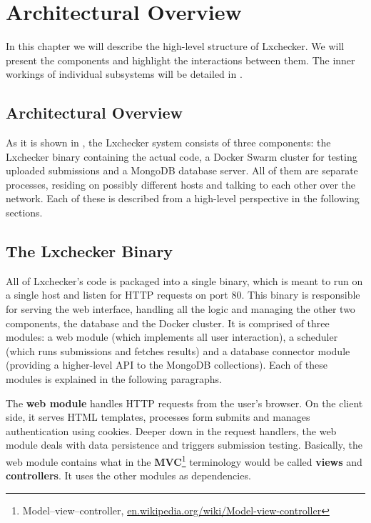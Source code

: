 \chapter{Architectural Overview}
\label{chapter:architecture}

In this chapter we will describe the high-level structure of Lxchecker. We will present the components and highlight the interactions between them. The inner workings of individual subsystems will be detailed in .


\section{Architectural Overview}
\label{sec:arch-overview}


As it is shown in , the Lxchecker system consists of three components: the Lxchecker binary containing the actual code, a Docker Swarm cluster for testing uploaded submissions and a MongoDB database server. All of them are separate processes, residing on possibly different hosts and talking to each other over the network. Each of these is described from a high-level perspective in the following sections.


\section{The Lxchecker Binary}
\label{sec:binary}

All of Lxchecker's code is packaged into a single binary, which is meant to run on a single host and listen for HTTP requests on port 80. This binary is responsible for serving the web interface, handling all the logic and managing the other two components, the database and the Docker cluster. It is comprised of three modules: a web module (which implements all user interaction), a scheduler (which runs submissions and fetches results) and a database connector module (providing a higher-level API to the MongoDB collections). Each of these modules is explained in the following paragraphs.

The \textbf{web module} handles HTTP requests from the user's browser. On the client side, it serves HTML templates, processes form submits and manages authentication using cookies. Deeper down in the request handlers, the web module deals with data persistence and triggers submission testing. Basically, the web module contains what in the \textbf{MVC}\footnote{Model–view–controller, \url{en.wikipedia.org/wiki/Model-view-controller}} terminology would be called \textbf{views} and \textbf{controllers}. It uses the other modules as dependencies.

